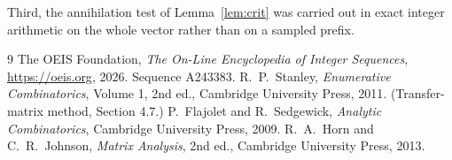 \documentclass[11pt,a4paper]{article}
\theoremstyle{plain}
\theoremstyle{definition}
\begin{document}
Third, the annihilation test of Lemma~\ref{lem:crit} was carried out in exact integer
arithmetic on the whole vector rather than on a sampled prefix.

\begin{thebibliography}{9}
 The OEIS Foundation, \emph{The On-Line Encyclopedia of Integer
Sequences}, \url{https://oeis.org}, 2026. Sequence A243383.
 R.~P.~Stanley, \emph{Enumerative Combinatorics}, Volume 1, 2nd ed.,
Cambridge University Press, 2011. (Transfer-matrix method, Section 4.7.)
 P.~Flajolet and R.~Sedgewick, \emph{Analytic Combinatorics}, Cambridge
University Press, 2009.
 R.~A.~Horn and C.~R.~Johnson, \emph{Matrix Analysis}, 2nd ed., Cambridge
University Press, 2013.
\end{thebibliography}
\end{document}
